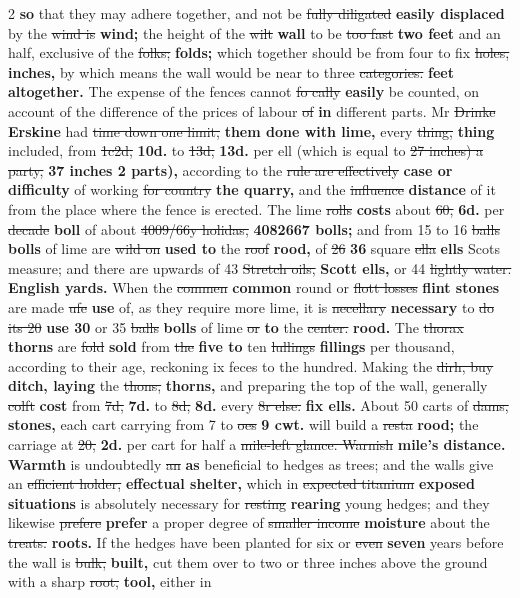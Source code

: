 \documentclass[10pt]{article}
\begin{document}
\begin{multicols}{2}
\textbf{so} that they may adhere together, and not be \sout{fully diligated} \textbf{easily displaced} by the \sout{wind is} \textbf{wind;} the height of the \sout{wilt} \textbf{wall} to be \sout{too fast} \textbf{two feet} and an half, exclusive of the \sout{folks;} \textbf{folds;} which together should be from four to fix \sout{holes,} \textbf{inches,} by which means the wall would be near to three \sout{categories.} \textbf{feet altogether.} The expense of the fences cannot \sout{fo cally} \textbf{easily} be counted, on account of the difference of the prices of labour \sout{of} \textbf{in} different parts. Mr \sout{Drinke} \textbf{Erskine} had \sout{time down one limit,} \textbf{them done with lime,} every \sout{thing,} \textbf{thing} included, from \sout{1c2d,} \textbf{10d.} to \sout{13d,} \textbf{13d.} per ell (which is equal to \sout{27 inches) a party,} \textbf{37 inches 2 parts),} according to the \sout{rule are effectively} \textbf{case or difficulty} of working \sout{for country} \textbf{the quarry,} and the \sout{influence} \textbf{distance} of it from the place where the fence is erected. The lime \sout{rolls} \textbf{costs} about \sout{60,} \textbf{6d.} per \sout{decade} \textbf{boll} of about \sout{4009/66y holidas,} \textbf{4082667 bolls;} and from 15 to 16 \sout{balls} \textbf{bolls} of lime are \sout{wild on} \textbf{used to} the \sout{roof} \textbf{rood,} of \sout{26} \textbf{36} square \sout{ella} \textbf{ells} Scots measure; and there are upwards of 43 \sout{Stretch oils,} \textbf{Scott ells,} or 44 \sout{lightly water.} \textbf{English yards.} When the \sout{commen} \textbf{common} round or \sout{flott losses} \textbf{flint stones} are made \sout{ufe} \textbf{use} of, as they require more lime, it is \sout{necellary} \textbf{necessary} to \sout{do its 20} \textbf{use 30} or 35 \sout{balls} \textbf{bolls} of lime \sout{or} \textbf{to} the \sout{center.} \textbf{rood.} The \sout{thorax} \textbf{thorns} are \sout{fold} \textbf{sold} from \sout{the} \textbf{five to} ten \sout{lullings} \textbf{fillings} per thousand, according to their age, reckoning ix feces to the hundred. Making the \sout{dirh, buy} \textbf{ditch, laying} the \sout{thons,} \textbf{thorns,} and preparing the top of the wall, generally \sout{colft} \textbf{cost} from \sout{7d,} \textbf{7d.} to \sout{8d,} \textbf{8d.} every \sout{8r else.} \textbf{fix ells.} About 50 carts of \sout{dams,} \textbf{stones,} each cart carrying from 7 to \sout{oes} \textbf{9 cwt.} will build a \sout{resta} \textbf{rood;} the carriage at \sout{20,} \textbf{2d.} per cart for half a \sout{mile-left glance. Warnish} \textbf{mile's distance. Warmth} is undoubtedly \sout{an} \textbf{as} beneficial to hedges as trees; and the walls give an \sout{efficient holder,} \textbf{effectual shelter,} which in \sout{expected titanium} \textbf{exposed situations} is absolutely necessary for \sout{resting} \textbf{rearing} young hedges; and they likewise \sout{prefere} \textbf{prefer} a proper degree of \sout{smaller income} \textbf{moisture} about the \sout{treats.} \textbf{roots.} If the hedges have been planted for six or \sout{even} \textbf{seven} years before the wall is \sout{bulk,} \textbf{built,} cut them over to two or three inches above the ground with a sharp \sout{root,} \textbf{tool,} either in 
\end{multicols}
\end{document}

